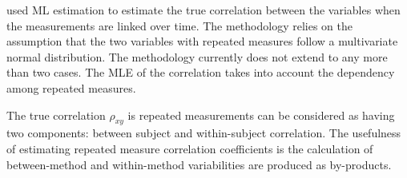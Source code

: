 \documentclass[12pt, a4paper]{report}
\theoremstyle{plain}
\theoremstyle{definition}
\theoremstyle{remark}
\begin{document}
\citet{lam} used ML estimation to estimate the true correlation between the variables when the measurements are linked over time. The methodology relies on the assumption that the two variables with repeated measures follow a multivariate normal distribution. The methodology currently does not extend to any more than two cases. The MLE of the correlation takes into account the dependency among repeated measures.

The true correlation $\rho_{xy}$ is repeated measurements can be considered as having two components: between subject and within-subject correlation. The usefulness of estimating repeated measure correlation coefficients is the calculation of between-method and within-method variabilities are produced as by-products.




\end{document}
